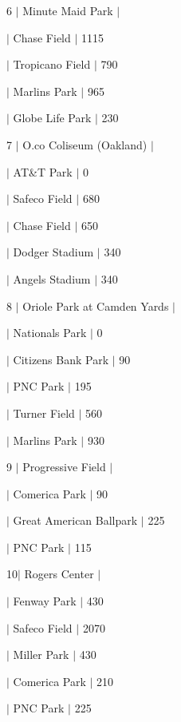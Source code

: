 6 $\vert$ Minute Maid Park $\vert$
\begin{DoxyItemize}
\item $\vert$ Chase Field $\vert$ 1115
\item $\vert$ Tropicano Field $\vert$ 790
\item $\vert$ Marlins Park $\vert$ 965
\item $\vert$ Globe Life Park $\vert$ 230
\end{DoxyItemize}

7 $\vert$ O.\+co Coliseum (Oakland) $\vert$
\begin{DoxyItemize}
\item $\vert$ AT\&T Park $\vert$ 0
\item $\vert$ Safeco Field $\vert$ 680
\item $\vert$ Chase Field $\vert$ 650
\item $\vert$ Dodger Stadium $\vert$ 340
\item $\vert$ Angels Stadium $\vert$ 340
\end{DoxyItemize}

8 $\vert$ Oriole Park at Camden Yards $\vert$
\begin{DoxyItemize}
\item $\vert$ Nationals Park $\vert$ 0
\item $\vert$ Citizens Bank Park $\vert$ 90
\item $\vert$ P\+NC Park $\vert$ 195
\item $\vert$ Turner Field $\vert$ 560
\item $\vert$ Marlins Park $\vert$ 930
\end{DoxyItemize}

9 $\vert$ Progressive Field $\vert$
\begin{DoxyItemize}
\item $\vert$ Comerica Park $\vert$ 90
\item $\vert$ Great American Ballpark $\vert$ 225
\item $\vert$ P\+NC Park $\vert$ 115
\end{DoxyItemize}

10$\vert$ Rogers Center $\vert$
\begin{DoxyItemize}
\item $\vert$ Fenway Park $\vert$ 430
\item $\vert$ Safeco Field $\vert$ 2070
\item $\vert$ Miller Park $\vert$ 430
\item $\vert$ Comerica Park $\vert$ 210
\item $\vert$ P\+NC Park $\vert$ 225
\end{DoxyItemize}

